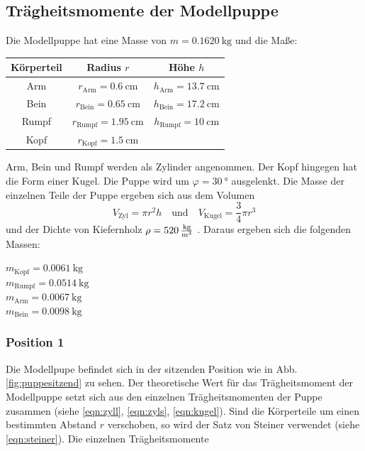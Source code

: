 \subsection{Trägheitsmomente der Modellpuppe}
Die Modellpuppe hat eine Masse von $m=\SI{0.1620}{\kg}$ und die Maße:\\
\begin{table}
    \centering
    \begin{tabular}{c|cc}
    \toprule
    Körperteil & Radius $r$ & Höhe $h$ \\ 
    \midrule
    Arm & $r_\text{Arm} = \SI{0.6}{\centi\metre}$ & \quad $h_\text{Arm} = \SI{13.7}{\centi\metre}$ \\
    Bein & $r_\text{Bein} = \SI{0.65}{\centi\metre}$ & \quad $h_\text{Bein} = \SI{17.2}{\centi\metre}$ \\
    Rumpf & $r_\text{Rumpf} = \SI{1.95}{\centi\metre}$ & \quad $h_\text{Rumpf} = \SI{10}{\centi\metre}$ \\
    Kopf & $r_\text{Kopf} = \SI{1.5}{\centi\metre}$ & \\
    \bottomrule
    \end{tabular}
\end{table}
\FloatBarrier
Arm, Bein und Rumpf werden als Zylinder angenommen.
Der Kopf hingegen hat die Form einer Kugel.
Die Puppe wird um $\varphi = \SI{30}{\degree}$ ausgelenkt.
Die Masse der einzelnen Teile der Puppe ergeben sich aus dem Volumen
\begin{equation*}
    V_\text{Zyl} = \pi r^2 h \quad \text{und} \quad V_\text{Kugel} = \frac{3}{4}\pi r^3
\end{equation*}
und der Dichte von Kiefernholz $\rho = \SI{520}{\frac{\kg}{\metre^3}}$ .
Daraus ergeben sich die folgenden Massen:\\
\begin{center}
    $m_\text{Kopf} = \SI{0.0061}{\kg}$ \\
    $m_\text{Rumpf} = \SI{0.0514}{\kg}$ \\
    $m_\text{Arm} = \SI{0.0067}{\kg}$ \\
    $m_\text{Bein} = \SI{0.0098}{\kg}$ \\
\end{center}
\subsubsection{Position 1}
Die Modellpupe befindet sich in der sitzenden Position wie in Abb. \ref{fig:puppesitzend} zu sehen.
Der theoretische Wert für das Trägheitsmoment der Modellpuppe setzt sich aus den einzelnen Trägheitsmomenten der Puppe zusammen (siehe \autoref{eqn:zyll}, \autoref{eqn:zyls}, \autoref{eqn:kugel}).
Sind die Körperteile um einen bestimmten Abstand $r$ verschoben, so wird der Satz von Steiner verwendet (siehe \autoref{eqn:steiner}).
Die einzelnen Trägheitsmomente

